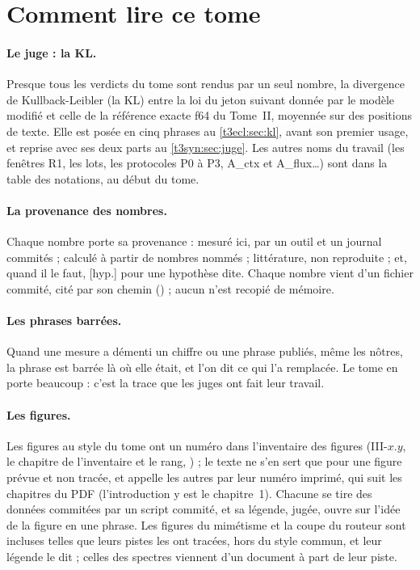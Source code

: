 \section{Comment lire ce tome}\label{t3int:sec:lire}

\paragraph{Le juge : la KL.} Presque tous les verdicts du tome sont rendus par un seul nombre, la divergence de Kullback-Leibler (la KL) entre la loi du jeton suivant donnée par le modèle modifié et celle de la référence exacte f64 du Tome~II, moyennée sur des positions de texte. Elle est posée en cinq phrases au \cref{t3ecl:sec:kl}, avant son premier usage, et reprise avec ses deux parts au \cref{t3syn:sec:juge}. Les autres noms du travail (les fenêtres R1, les lots, les protocoles P0 à P3, A\_ctx et A\_flux\dots) sont dans la table des notations, au début du tome.

\paragraph{La provenance des nombres.} Chaque nombre porte sa provenance : \mes{} mesuré ici, par un outil et un journal commités ; \calc{} calculé à partir de nombres nommés ; \litt{} littérature, non reproduite ; et, quand il le faut, [hyp.] pour une hypothèse dite. Chaque nombre vient d'un fichier commité, cité par son chemin () ; aucun n'est recopié de mémoire.

\paragraph{Les phrases barrées.} Quand une mesure a démenti un chiffre ou une phrase publiés, même les nôtres, la phrase est barrée  là où elle était, et l'on dit ce qui l'a remplacée. Le tome en porte beaucoup : c'est la trace que les juges ont fait leur travail.

\paragraph{Les figures.} Les figures au style du tome ont un numéro dans l'inventaire des figures (III-$x$.$y$, le chapitre de l'inventaire et le rang, ) ; le texte ne s'en sert que pour une figure prévue et non tracée, et appelle les autres par leur numéro imprimé, qui suit les chapitres du PDF (l'introduction y est le chapitre~1). Chacune se tire des données commitées par un script commité, et sa légende, jugée, ouvre sur l'idée de la figure en une phrase. Les figures du mimétisme et la coupe du routeur sont incluses telles que leurs pistes les ont tracées, hors du style commun, et leur légende le dit ; celles des spectres viennent d'un document à part de leur piste.

